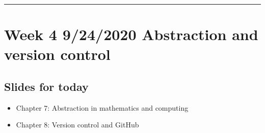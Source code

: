 \documentclass[letterpaper,10pt,english]{sphinxmanual}
\begin{document}
\bigskip\hrule\bigskip



\section{Week 4 \sphinxhyphen{} 9/24/2020 \sphinxhyphen{} Abstraction and version control}
\label{\detokenize{course-schedule:week-4-9-24-2020-abstraction-and-version-control}}

\subsection{Slides for today}
\label{\detokenize{course-schedule:id5}}\begin{itemize}
\item {} 
Chapter 7: Abstraction in mathematics and computing

\item {} 
Chapter 8: Version control and GitHub

\end{itemize}
\end{document}
